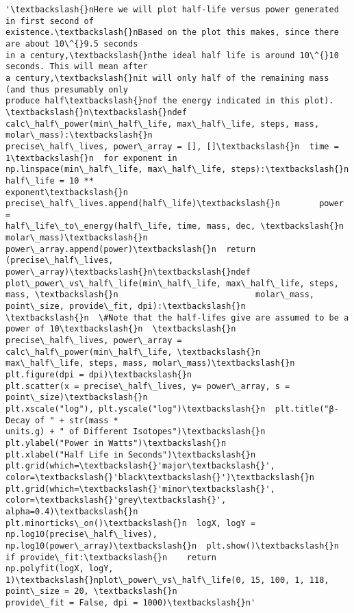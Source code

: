 \documentclass[11pt]{article}
\makeatletter
\newcommand{\boxspacing}{\kern\kvtcb@left@rule\kern\kvtcb@boxsep}
\newcommand{\prompt}[4]{
        \ttfamily\llap{{\color{#2}[#3]:\hspace{3pt}#4}}\vspace{-\baselineskip}
    }
\makeatother
\begin{document}
            \begin{tcolorbox}[breakable, size=fbox, boxrule=.5pt, pad at break*=1mm, opacityfill=0]
\prompt{Out}{outcolor}{112}{\boxspacing}
\begin{Verbatim}[commandchars=\\\{\}]
'\textbackslash{}nHere we will plot half-life versus power generated in first second of
existence.\textbackslash{}nBased on the plot this makes, since there are about 10\^{}9.5 seconds
in a century,\textbackslash{}nthe ideal half life is around 10\^{}10 seconds. This will mean after
a century,\textbackslash{}nit will only half of the remaining mass (and thus presumably only
produce half\textbackslash{}nof the energy indicated in this plot). \textbackslash{}n\textbackslash{}ndef
calc\_half\_power(min\_half\_life, max\_half\_life, steps, mass, molar\_mass):\textbackslash{}n
precise\_half\_lives, power\_array = [], []\textbackslash{}n  time = 1\textbackslash{}n  for exponent in
np.linspace(min\_half\_life, max\_half\_life, steps):\textbackslash{}n        half\_life = 10 **
exponent\textbackslash{}n        precise\_half\_lives.append(half\_life)\textbackslash{}n        power =
half\_life\_to\_energy(half\_life, time, mass, dec, \textbackslash{}n
molar\_mass)\textbackslash{}n        power\_array.append(power)\textbackslash{}n  return (precise\_half\_lives,
power\_array)\textbackslash{}n\textbackslash{}ndef plot\_power\_vs\_half\_life(min\_half\_life, max\_half\_life, steps,
mass, \textbackslash{}n                            molar\_mass, point\_size, provide\_fit, dpi):\textbackslash{}n
\textbackslash{}n  \#Note that the half-lifes give are assumed to be a power of 10\textbackslash{}n  \textbackslash{}n
precise\_half\_lives, power\_array = calc\_half\_power(min\_half\_life, \textbackslash{}n
max\_half\_life, steps, mass, molar\_mass)\textbackslash{}n  plt.figure(dpi = dpi)\textbackslash{}n
plt.scatter(x = precise\_half\_lives, y= power\_array, s = point\_size)\textbackslash{}n
plt.xscale("log"), plt.yscale("log")\textbackslash{}n  plt.title("β- Decay of " + str(mass *
units.g) + " of Different Isotopes")\textbackslash{}n  plt.ylabel("Power in Watts")\textbackslash{}n
plt.xlabel("Half Life in Seconds")\textbackslash{}n  plt.grid(which=\textbackslash{}'major\textbackslash{}',
color=\textbackslash{}'black\textbackslash{}')\textbackslash{}n  plt.grid(which=\textbackslash{}'minor\textbackslash{}', color=\textbackslash{}'grey\textbackslash{}', alpha=0.4)\textbackslash{}n
plt.minorticks\_on()\textbackslash{}n  logX, logY = np.log10(precise\_half\_lives),
np.log10(power\_array)\textbackslash{}n  plt.show()\textbackslash{}n  if provide\_fit:\textbackslash{}n    return
np.polyfit(logX, logY, 1)\textbackslash{}nplot\_power\_vs\_half\_life(0, 15, 100, 1, 118,
point\_size = 20, \textbackslash{}n                        provide\_fit = False, dpi = 1000)\textbackslash{}n'
\end{Verbatim}
\end{tcolorbox}
        
\end{document}
